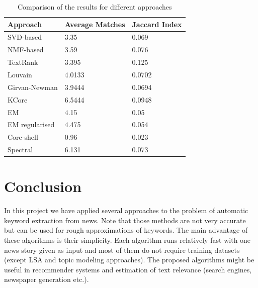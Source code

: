 \documentclass[a4paper]{article}
\begin{document}
 \begin{table}[h!]
        \center
        \begin{tabular}{|p{3cm}|p{3cm}|p{2cm}|}
        \hline
        Approach & Average Matches & Jaccard Index \\
        \hline
        SVD-based & 3.35 & 0.069\\
        \hline
        NMF-based & 3.59 & 0.076 \\
        \hline
        TextRank & 3.395 & 0.125 \\
        \hline
		Louvain &  4.0133 & 0.0702 \\
 		\hline
		Girvan-Newman &  3.9444 &  0.0694 \\
 		\hline
		KCore &  6.5444 & 0.0948 \\
         \hline
        EM &  4.15 & 0.05 \\
         \hline
        EM regularised &  4.475 & 0.054 \\
         \hline
        Core-shell &  0.96 & 0.023 \\
         \hline
        Spectral &  6.131 & 0.073 \\
         \hline
        \end{tabular}
        \caption{Comparison of the results for different approaches}
     \end{table}
 
\section*{Conclusion}
	In this project we have applied several approaches to the problem of automatic keyword extraction from news. Note that those methods are not very accurate but can be used for rough approximations of keywords. The main advantage of these algorithms is their simplicity. Each algorithm runs relatively fast with one news story given as input and most of them do not require training datasets (except LSA and topic modeling approaches). The proposed algorithms might be useful in recommender systems and estimation of text relevance (search engines, newspaper generation etc.). 

\printbibliography
\end{document}
